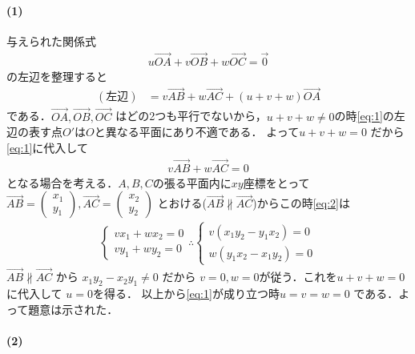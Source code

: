 \documentclass[../../main.tex]{subfiles}
\begin{document}
\paragraph{(1)}

与えられた関係式
\begin{align}
  u\overrightarrow{OA}+v\overrightarrow{OB}+w\overrightarrow{OC}=\vec{0} \label{eq:1}
\end{align}
の左辺を整理すると
\begin{align}
  (\text{左辺})
  & = v \overrightarrow{AB} + w \overrightarrow{AC} + (u+v+w) \overrightarrow{OA}
\end{align}
である．$\overrightarrow{OA}, \overrightarrow{OB}, \overrightarrow{OC}$ はどの2つも平行でないから，$u+v+w \neq 0$の時\cref{eq:1}の左辺の表す点$O'$は$O$と異なる平面にあり不適である．
よって$u+v+w = 0$ だから\cref{eq:1}に代入して
\begin{align}
  v \overrightarrow{AB} + w \overrightarrow{AC} = 0 \label{eq:2}
\end{align}
となる場合を考える．$A,B,C$の張る平面内に$xy$座標をとって
$\overrightarrow{AB} =
\begin{pmatrix} x_1 \\ y_1
\end{pmatrix}, \overrightarrow{AC} =
\begin{pmatrix} x_2 \\ y_2
\end{pmatrix}$ とおける($\overrightarrow{AB} \not\parallel \overrightarrow{AC}$)からこの時\cref{eq:2}は
\begin{align}
  \begin{cases}
    v x_1 + w x_2 = 0 \\
    v y_1 + w y_2 = 0
  \end{cases}
  \therefore
  \begin{cases}
    v (x_1 y_2 - y_1 x_2) = 0 \\
    w (y_1 x_2 - x_1 y_2) = 0
  \end{cases}
\end{align}
$\overrightarrow{AB} \not\parallel \overrightarrow{AC}$ から $x_1 y_2 - x_2 y_1 \neq 0$ だから $v=0, w=0$が従う．これを$u+v+w=0$に代入して $u=0$を得る．
以上から\cref{eq:1}が成り立つ時$u=v=w=0$ である．よって題意は示された．

\paragraph{(2)}
\end{document}
